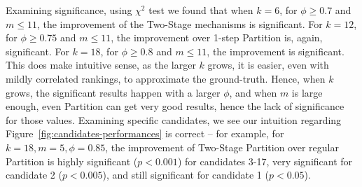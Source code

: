 \documentclass[letterpaper]{article} %
\begin{document}
Examining significance, using $\chi^{2}$ test we found that when $k= 6$, for $\phi\geq 0.7$ and $m\leq 11$, the improvement of the Two-Stage mechanisms is significant. For $k=12$, for $\phi\geq 0.75$ and $m\leq 11$, the improvement over 1-step Partition is, again, significant. For $k= 18$, for $\phi\geq 0.8$ and $m\leq 11$, the improvement is significant. This does make intuitive sense, as the larger $k$ grows, it is easier, even with mildly correlated rankings, to approximate the ground-truth. Hence, when $k$ grows, the significant results happen with a larger $\phi$, and when $m$ is large enough, even Partition can get very good results, hence the lack of significance for those values. Examining specific candidates, we see our intuition regarding Figure~\ref{fig:candidates-performances} is correct -- for example, for $k=18, m=5, \phi=0.85$, the improvement of Two-Stage Partition over regular Partition is highly significant ($p<0.001$) for candidates 3-17, very significant for candidate 2 ($p<0.005$), and still significant for candidate 1 ($p<0.05$).
\end{document}
